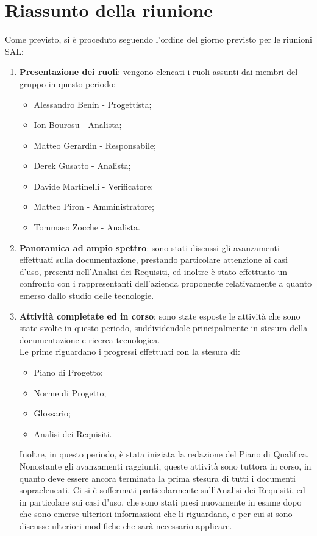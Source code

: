 \section{Riassunto della riunione}
Come previsto, si è proceduto seguendo l'ordine del giorno previsto per le riunioni SAL:
\begin{enumerate}
    \item \textbf{Presentazione dei ruoli}: vengono elencati i ruoli assunti dai membri del gruppo in questo periodo:
    \begin{itemize}
        \item Alessandro Benin - Progettista;
        \item Ion Bourosu - Analista;
        \item Matteo Gerardin - Responsabile;
        \item Derek Gusatto - Analista;
        \item Davide Martinelli - Verificatore;
        \item Matteo Piron - Amministratore;
        \item Tommaso Zocche - Analista.
    \end{itemize}
    \item \textbf{Panoramica ad ampio spettro}: sono stati discussi gli avanzamenti effettuati sulla documentazione, prestando particolare attenzione ai casi d'uso, presenti nell'Analisi dei Requisiti, ed inoltre è stato effettuato un confronto con i rappresentanti dell'azienda proponente relativamente a quanto emerso dallo studio delle tecnologie.
    \item \textbf{Attività completate ed in corso}: sono state esposte le attività che sono state svolte in questo periodo, suddividendole principalmente in stesura della documentazione e ricerca tecnologica.\\
    Le prime riguardano i progressi effettuati con la stesura di:
    \begin{itemize}
        \item Piano di Progetto;
        \item Norme di Progetto;
        \item Glossario;
        \item Analisi dei Requisiti.
    \end{itemize}
    Inoltre, in questo periodo, è stata iniziata la redazione del Piano di Qualifica. Nonostante gli avanzamenti raggiunti, queste attività sono tuttora in corso, in quanto deve essere ancora terminata la prima stesura di tutti i documenti sopraelencati. Ci si è soffermati particolarmente sull'Analisi dei Requisiti, ed in particolare sui casi d'uso, che sono stati presi nuovamente in esame dopo che sono emerse ulteriori informazioni che li riguardano, e per cui si sono discusse ulteriori modifiche che sarà necessario applicare.\\

\end{enumerate}
